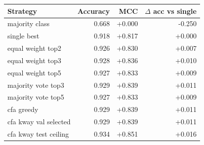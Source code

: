 \begin{tabular}{lrrr}
\toprule
Strategy & Accuracy & MCC & $\Delta$ acc vs single \\
\midrule
majority class & 0.668 & +0.000 & -0.250 \\
single best & 0.918 & +0.817 & +0.000 \\
equal weight top2 & 0.926 & +0.830 & +0.007 \\
equal weight top3 & 0.928 & +0.836 & +0.010 \\
equal weight top5 & 0.927 & +0.833 & +0.009 \\
majority vote top3 & 0.929 & +0.839 & +0.011 \\
majority vote top5 & 0.927 & +0.833 & +0.009 \\
cfa greedy & 0.929 & +0.839 & +0.011 \\
cfa kway val selected & 0.929 & +0.839 & +0.011 \\
cfa kway test ceiling & 0.934 & +0.851 & +0.016 \\
\bottomrule
\end{tabular}